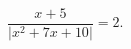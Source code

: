 \begin{ex}[type=equation]
	\begin{condition}
		$\dfrac{x + 5}{\big|x^2 + 7x + 10\big|}= 2.$
	\end{condition}
\end{ex}